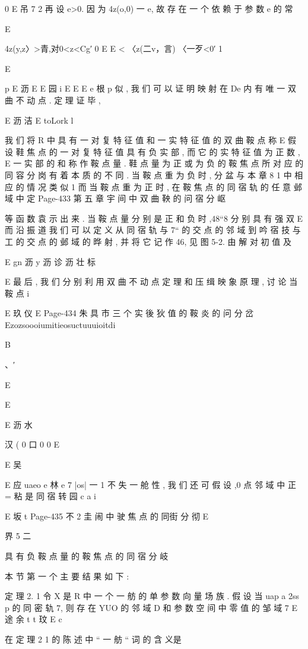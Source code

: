 {{{{{{{0
E 吊 7
2
再 设 e>0. 因 为 4z(o,0) 一 e, 故 存 在 一 个 依 赖 于 参 数 e 的 常

E

4z(y,z〉>青,对0<z<Cg′ 0
E
E <
〈z(二v，言) 〈一歹<0′ 1

E

p
E 沥
E
E 园
i
E E E e 根 p
似 , 我 们 可 以 证 明 映 射 在 De 内 有 唯 一 双 曲 不 动 点 . 定 理 证 毕 ,

E 沥 洁 E toLork l

我 们 将 R 中 具 有 一 对 复 特 征 值 和 一 实 特 征 值 的 双 曲 鞍 点 称
E
假 设 鞋 焦 点 的 一 对 复 特 征 值 具 有 负 实 部 , 而 它 的 实 特 征 值 为 正 数 ,
E 一
实 部 的 和 称 作 鞍 点 量 . 鞋 点 量 为 正 或 为 负 的 鞍 焦 点 所 对 应 的 同 容
分 岗 有 着 本 质 的 不 同 . 当 鞍 点 重 为 负 时 , 分 盆 与 本 章 8 1 中 相 应 的
情 况 类 似 1 而 当 鞍 点 重 为 正 时 , 在 鞍 焦 点 的 同 宿 轨 的 任 意 邺 域 中 定
Page-433
第 五 章 宇 间 中 双 曲 鞅 的 问 宿 分 岖

等 函 数 袁 示 出 来 . 当 鞍 点 量 分 别 是 正 和 负 时 ,48“8 分 别 具 有 强 双
E
而 沿 振 道 我 们 可 以 定 义 从 同 宿 轨 与 7“ 的 交 点 的 邻 域 到 吟 宿 技 与
工 的 交 点 的 邺 域 的 晔 射 , 并 将 它 记 作 46, 见 图 5-2. 由 解 对 初 值 及

E gn 沥 y 沥
诊 沥 壮 标

E
最 后 , 我 们 分 别 利 用 双 曲 不 动 点 定 理 和 压 缉 映 象 原 理 , 讨 论 当 鞍 点
i

E 玖 仪
E
Page-434
朱 具 市 三 个 实 後 狄 值 的 鞍 炎 的 问 分 岔
Ezozsoooiumitieosuctuuuioitdi

B

、′

E

E

E 沥 水
{汉 ( 0 口 0 0
E

E 吴

E 应
uaeo e 林 e 7
|os| 一 1 不 失 一 舱 性 , 我 们 还 可 假 设 ,0 点 邻 域 中 正 = 粘 是 同 宿 转
园 c a i

E 坂 t
Page-435
不 2 圭 闹 中 驶 焦 点 的 同街 分 彻 E

界
5 二

具 有 负 鞍 点 量 的 鞍 焦 点 的 同 宿 分 岐

本 节 第 一 个 主 要 结 果 如 下 :

定 理 2. 1 令 X 是 R 中 一 个 一 舫 的 单 参 数 向 量 场 族 . 假 设 当
uap a 2ss p
的 同 密 轨 7, 则 存 在 YUO 的 邻 域 D 和 参 数 空 间 中 零 值 的 邹 域 7
E 途 余 t t
玟
E c

在 定 理 2 1 的 陈 述 中 “ 一 舫 “ 词 的 含 义是

}}}}}}}}
